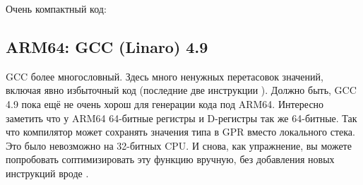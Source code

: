 Очень компактный код:



\subsection{ARM64: \NonOptimizing GCC (Linaro) 4.9}



\NonOptimizing GCC более многословный.
Здесь много ненужных перетасовок значений, включая явно избыточный код 
(последние две инструкции ).
Должно быть, GCC 4.9 пока ещё не очень хорош для генерации кода под ARM64.
Интересно заметить что у ARM64 64-битные регистры и D-регистры так же 64-битные.
Так что компилятор может сохранять значения типа \Tdouble в \ac{GPR} вместо локального стека.
Это было невозможно на 32-битных CPU.
И снова, как упражнение, вы можете попробовать соптимизировать эту функцию вручную, без добавления
новых инструкций вроде .

